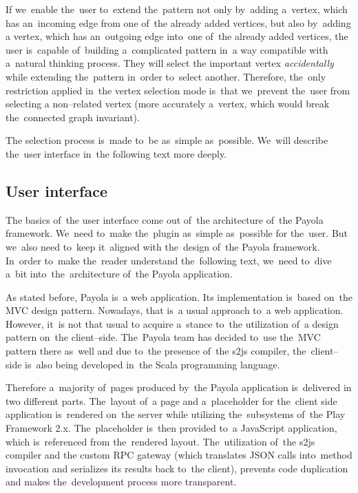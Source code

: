 If we~enable the~user to~extend the~pattern not only by~adding a~vertex, 
which has an~incoming edge from one of~the already added vertices, but also by~adding 
a vertex, which has an~outgoing edge into~one of~the already added vertices, 
the user is~capable of~building a~complicated pattern in~a way compatible with a~natural thinking process.
They will select the
important vertex \emph{accidentally} while extending the~pattern in~order to~select another. Therefore, the~only restriction 
applied in~the vertex selection mode is~that we~prevent the~user from selecting 
a non--related vertex (more accurately a~vertex, which would break the~connected 
graph invariant).

The selection process is~made to~be as~simple as~possible. We~will describe the~user interface in~the following text more deeply.

\subsection{User interface}
The basics of~the user interface come out of~the architecture of~the Payola 
framework. We~need to~make the~plugin as~simple as~possible for the~user. But we~also need to~keep it~aligned with the~design of~the Payola framework. In~order to~make the~reader understand the~following text, we~need to~dive a~bit into~the~architecture of~the Payola application.

As stated before, Payola is~a web application. Its implementation is~based on~the MVC 
design pattern. Nowadays, that is~a usual approach to~a web application. However, it~is not that usual 
to acquire a~stance to~the utilization of~a design pattern on~the client--side. The~Payola team has decided to~use the~MVC pattern there as~well and due to~the presence of~the s2js compiler, the~client--side is~also being developed in~the Scala programming language.

Therefore a~majority of~pages produced by~the Payola application is~delivered 
in two different parts. The~layout of~a page and a~placeholder for the~client 
side application is~rendered on~the server while utilizing the~subsystems of~the 
Play Framework 2.x. The~placeholder is~then provided to~a JavaScript application,
which is~referenced from the~rendered layout. The~utilization of~the s2js compiler and
the custom RPC gateway (which translates JSON calls into~method invocation and serializes its results
back to~the client), prevents code duplication and makes the~development process more transparent.

